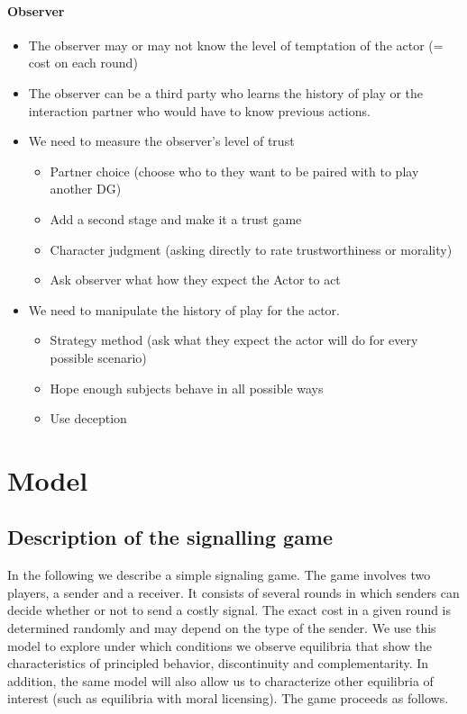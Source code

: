 \documentclass[11pt]{article}
\theoremstyle{plainCl1}
\begin{document}
\paragraph{Observer}
\begin{itemize}
    \item The observer may or may not know the level of temptation of the actor (= cost on each round)
    \item The observer can be a third party who learns the history of play or the interaction partner who would have to know previous actions. 
    \item We need to measure the observer's level of trust
    	\begin{itemize}
	\item Partner choice (choose who to they want to be paired with to play another DG)
	\item Add a second stage and make it a trust game
    	\item Character judgment (asking directly to rate trustworthiness or morality)
	\item Ask observer what how they expect the Actor to act
    	\end{itemize}
    \item We need to manipulate the history of play for the actor. 
    	\begin{itemize}
	\item Strategy method (ask what they expect the actor will do for every possible scenario)
	\item Hope enough subjects behave in all possible ways
    	\item Use deception
    	\end{itemize}
\end{itemize}


\section{Model}

\subsection{Description of the signalling game}


In the following we describe a simple signaling game. The game involves two players, a sender and a receiver. It consists of several rounds in which senders can decide whether or not to send a costly signal. The exact cost in a given round is determined randomly and may depend on the type of the sender. We use this model to explore under which conditions we observe equilibria that show the characteristics of principled behavior, discontinuity and complementarity. In addition, the same model will also allow us to characterize other equilibria of interest (such as equilibria with moral licensing).
The game proceeds as follows. 
\end{document}
